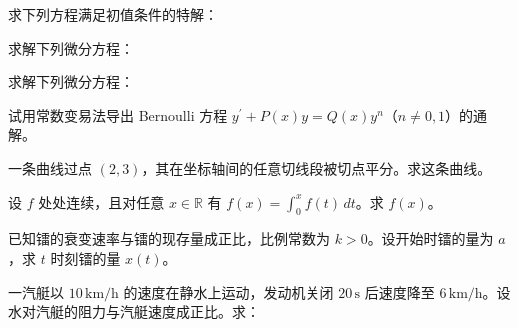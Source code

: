 \newpage
\noindent\begin{minipage}{\textwidth}
求下列方程满足初值条件的特解：
\end{minipage}\par\vfill
\noindent\begin{minipage}{\textwidth}
求解下列微分方程：
\end{minipage}\par\vfill
\noindent\begin{minipage}{\textwidth}
求解下列微分方程：
\end{minipage}\par\vfill
\noindent\begin{minipage}{\textwidth}
试用常数变易法导出 Bernoulli 方程 $y^{\prime}+P(x)y=Q(x)y^n$（$n\ne0,1$）的通解。
\end{minipage}\par\vfill
\newpage
\noindent\begin{minipage}{\textwidth}
一条曲线过点 $(2,3)$，其在坐标轴间的任意切线段被切点平分。求这条曲线。
\end{minipage}\par\vfill
\noindent\begin{minipage}{\textwidth}
设 $f$ 处处连续，且对任意 $x\in\mathbb R$ 有 $f(x)=\int_0^x f(t)\,dt$。求 $f(x)$。
\end{minipage}\par\vfill
\noindent\begin{minipage}{\textwidth}
已知镭的衰变速率与镭的现存量成正比，比例常数为 $k>0$。设开始时镭的量为 $a$，求 $t$ 时刻镭的量 $x(t)$。
\end{minipage}\par\vfill
\noindent\begin{minipage}{\textwidth}
一汽艇以 $10\,\mathrm{km/h}$ 的速度在静水上运动，发动机关闭 $20\,\mathrm{s}$ 后速度降至 $6\,\mathrm{km/h}$。设水对汽艇的阻力与汽艇速度成正比。求：
\end{minipage}\par\vfill
